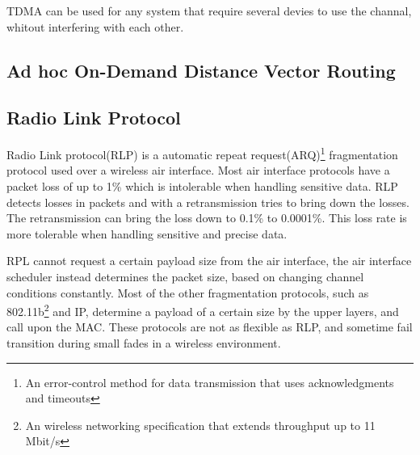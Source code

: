 TDMA can be used for any system that require several devies to use the channal, whitout interfering with each other.

\subsection{Ad hoc On-Demand Distance Vector Routing}


\subsection{Radio Link Protocol}
Radio Link protocol(RLP) is a automatic repeat request(ARQ)\footnote{An error-control method for data transmission that uses acknowledgments and timeouts} fragmentation protocol used over a wireless air interface.
Most air interface protocols have a packet loss of up to 1\% which is intolerable when handling sensitive data.
RLP detects losses in packets and with a retransmission tries to bring down the losses.
The retransmission can bring the loss down to 0.1\% to 0.0001\%.
This loss rate is more tolerable when handling sensitive and precise data.

RPL cannot request a certain payload size from the air interface, the air interface scheduler instead determines the packet size, based on changing channel conditions constantly.
Most of the other fragmentation protocols, such as 802.11b\footnote{An wireless networking specification that extends throughput up to 11 Mbit/s} and IP, determine a payload of a certain size by the upper layers, and call upon the MAC.
These protocols are not as flexible as RLP, and sometime fail transition during small fades in a wireless environment. 